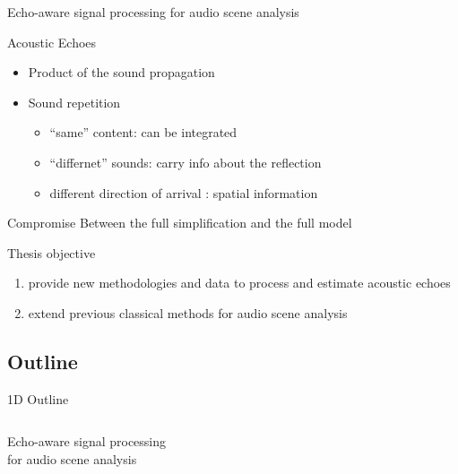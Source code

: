 \documentclass[9pt,dvipsnames]{beamer}
\renewenvironment{block}[1]{\begin{oldblock}{#1}\smallskip}{\end{oldblock}}
\begin{document}
    \begin{frame}{\alert{Echo-aware} signal processing for audio scene analysis}
        
        \begin{block}{Acoustic Echoes}
            \begin{itemize}
                \item Product of the sound propagation
                \item Sound repetition
                \begin{itemize}
                    \item ``same'' content: can be integrated
                    \item ``differnet'' sounds: carry info about the reflection
                    \item different direction of arrival : spatial information
                \end{itemize}
            \end{itemize}
        \end{block}
        
        \begin{block}{Compromise}
        Between the full simplification and the full model
        \end{block}
        
        \begin{block}{Thesis objective}
            \begin{enumerate}
                \item provide new methodologies and data to process and estimate acoustic echoes
                \item extend previous classical methods for audio scene analysis
            \end{enumerate}
        \end{block}
    \end{frame}
    
    
\subsection{Outline}

\begin{frame}{1D Outline}
    \begin{columns}
        \begin{column}{0.3\textwidth}
            Echo-aware signal processing
            \\for audio scene analysis
        \end{column}
        \begin{column}{0.6\textwidth}
            \color{white}
            \tableofcontents
        \end{column}
    \end{columns}
\end{frame}
\end{document}
